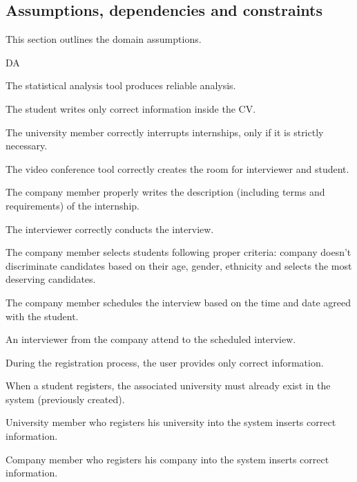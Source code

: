 \subsection{Assumptions, dependencies and constraints}
This section outlines the domain assumptions.
\begin{listInSquareBrackets}{DA}
    \item The statistical analysis tool produces reliable analysis.
    \item The student writes only correct information inside the CV.
    \item The university member correctly interrupts internships, only if it is strictly necessary.
    \item The video conference tool correctly creates the room for interviewer and student.
    \item The company member properly writes the description (including terms and requirements) of the internship.
    \item The interviewer correctly conducts the interview.
    \item The company member selects students following proper criteria: company doesn't discriminate candidates based on their age, gender, ethnicity and selects the most deserving candidates.
    \item The company member schedules the interview based on the time and date agreed with the student.
    \item An interviewer from the company attend to the scheduled interview.
    \item During the registration process, the user provides only correct information.
    \item When a student registers, the associated university must already exist in the system (previously created).
    \item University member who registers his university into the system inserts correct information.
    \item Company member who registers his company into the system inserts correct information.
\end{listInSquareBrackets}

\newpage
